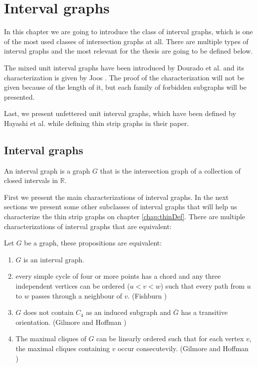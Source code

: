 \chapter{Interval graphs}

In this chapter we are going to introduce the class of interval graphs, which is
 one of the most used classes of intersection graphs at all. There are multiple types of
 interval graphs and the most relevant for the thesis are going to be defined below.

The mixed unit interval graphs have been introduced by Dourado et al.
\cite{douradoMixedUnitInterval2012} and its characterization is given by Joos
\cite{joosCharacterizationMixedUnit2013}. The proof of the characterization will not
be given because of the length of it, but each family of forbidden subgraphs will be
presented.

Last, we present unfettered unit interval graphs, which have been defined by Hayashi et al. \cite{hayashiThinStripGraphs2017} while
defining thin strip graphs in their paper.

\section{Interval graphs}


An interval graph is a graph $G$ that is the intersection graph of a collection
of closed intervals in $\mathbb{R}$.

First we present the main characterizations of interval graphs. In the next sections we present some other subclasses of interval graphs that will help us characterize the thin strip graphs on chapter \ref{chap:thinDef}. There are multiple characterizations of interval graphs that are equivalent:

\begin{theorem}
  \label{theo:intervalChord}
  Let $G$ be a graph, these propositions are equivalent:
  \begin{enumerate}
    \item $G$ is an interval graph.

    \item every simple cycle of four or more
      points has a chord and any three independent vertices can be ordered ($u<v<w$) such that every path from $u$ to $w$ passes through a neighbour of $v$. (Fishburn \cite{FISHBURN1985135})

    \item $G$ does not contain $C_4$ as an induced subgraph and $\overline{G}$ has a transitive orientation. (Gilmore and Hoffman \cite{gilmoreCharacterizationComparabilityGraphs1964})

    \item The maximal cliques of $G$ can be linearly ordered such that for each vertex $v$, the maximal cliques containing $v$ occur consecutevily. (Gilmore and Hoffman \cite{gilmoreCharacterizationComparabilityGraphs1964})

  \end{enumerate}

\end{theorem}

